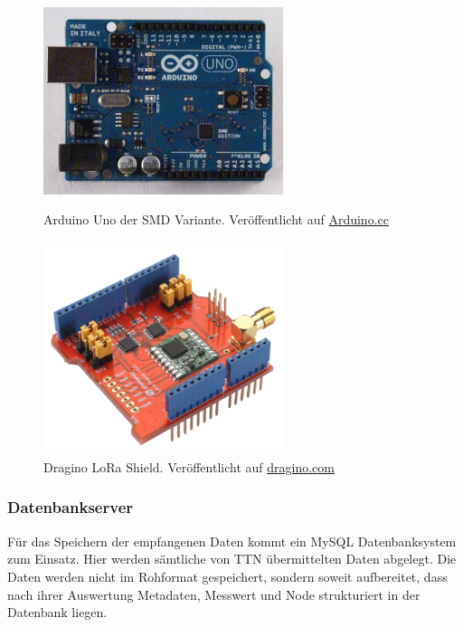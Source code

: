 \begin{figure}[H]
	\centering
	\begin{minipage}[t]{0.45\linewidth}
		\includegraphics[width=7cm]{figures/ArduinoUnoSMDFront.jpg}
		\caption{Arduino Uno der SMD Variante. Veröffentlicht auf \href{https://www.arduino.cc/en/Main/ArduinoBoardUnoSMD}{Arduino.cc}}
		\label{fig:ardoinoUno}
	\end{minipage}
	\hfill
	\begin{minipage}[t]{0.45\linewidth}
		\includegraphics[width=7cm]{figures/LoraShield-1.png}
		\caption{Dragino LoRa Shield. Veröffentlicht auf \href{http://www.dragino.com/products/lora/item/102-lora-shield.html}{dragino.com}}
		\label{fig:draginoShield}
	\end{minipage}
\end{figure}

\subsubsection{Datenbankserver}
Für das Speichern der empfangenen Daten kommt ein MySQL Datenbanksystem zum Einsatz. Hier werden sämtliche von TTN übermittelten Daten abgelegt. Die Daten werden nicht im
Rohformat gespeichert, sondern soweit aufbereitet, dass nach ihrer Auswertung Metadaten, Messwert und Node strukturiert in der Datenbank liegen.


